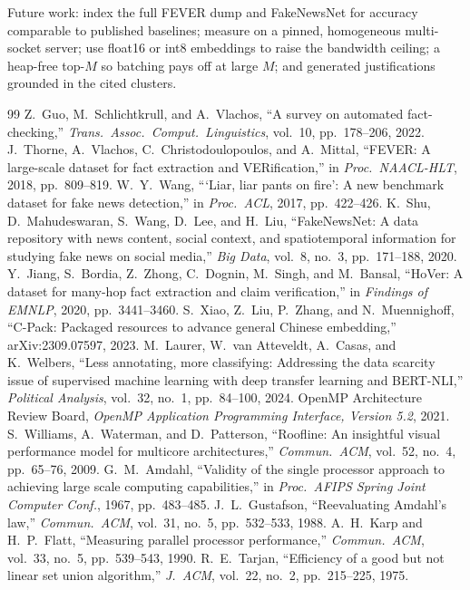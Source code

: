 \documentclass[conference,a4paper]{IEEEtran}
\begin{document}
Future work: index the full FEVER dump and FakeNewsNet for accuracy comparable to published baselines; measure on a
pinned, homogeneous multi-socket server; use float16 or int8 embeddings to raise the bandwidth ceiling; a heap-free
top-$M$ so batching pays off at large $M$; and generated justifications grounded in the cited clusters.

\begin{thebibliography}{99}
 Z.~Guo, M.~Schlichtkrull, and A.~Vlachos, ``A survey on automated fact-checking,'' \emph{Trans.\
Assoc.\ Comput.\ Linguistics}, vol.~10, pp.~178--206, 2022.
 J.~Thorne, A.~Vlachos, C.~Christodoulopoulos, and A.~Mittal, ``FEVER: A large-scale dataset for fact
extraction and VERification,'' in \emph{Proc.\ NAACL-HLT}, 2018, pp.~809--819.
\bibitem{liar} W.~Y.~Wang, ```Liar, liar pants on fire': A new benchmark dataset for fake news detection,'' in
\emph{Proc.\ ACL}, 2017, pp.~422--426.
 K.~Shu, D.~Mahudeswaran, S.~Wang, D.~Lee, and H.~Liu, ``FakeNewsNet: A data repository with news
content, social context, and spatiotemporal information for studying fake news on social media,'' \emph{Big Data},
vol.~8, no.~3, pp.~171--188, 2020.
 Y.~Jiang, S.~Bordia, Z.~Zhong, C.~Dognin, M.~Singh, and M.~Bansal, ``HoVer: A dataset for many-hop fact
extraction and claim verification,'' in \emph{Findings of EMNLP}, 2020, pp.~3441--3460.
\bibitem{bge} S.~Xiao, Z.~Liu, P.~Zhang, and N.~Muennighoff, ``C-Pack: Packaged resources to advance general Chinese
embedding,'' arXiv:2309.07597, 2023.
 M.~Laurer, W.~van Atteveldt, A.~Casas, and K.~Welbers, ``Less annotating, more classifying:
Addressing the data scarcity issue of supervised machine learning with deep transfer learning and BERT-NLI,''
\emph{Political Analysis}, vol.~32, no.~1, pp.~84--100, 2024.
 OpenMP Architecture Review Board, \emph{OpenMP Application Programming Interface, Version 5.2}, 2021.
\bibitem{roofline} S.~Williams, A.~Waterman, and D.~Patterson, ``Roofline: An insightful visual performance model for
multicore architectures,'' \emph{Commun.\ ACM}, vol.~52, no.~4, pp.~65--76, 2009.
\bibitem{amdahl} G.~M.~Amdahl, ``Validity of the single processor approach to achieving large scale computing
capabilities,'' in \emph{Proc.\ AFIPS Spring Joint Computer Conf.}, 1967, pp.~483--485.
\bibitem{gustafson} J.~L.~Gustafson, ``Reevaluating Amdahl's law,'' \emph{Commun.\ ACM}, vol.~31, no.~5, pp.~532--533,
1988.
 A.~H.~Karp and H.~P.~Flatt, ``Measuring parallel processor performance,'' \emph{Commun.\ ACM},
vol.~33, no.~5, pp.~539--543, 1990.
 R.~E.~Tarjan, ``Efficiency of a good but not linear set union algorithm,'' \emph{J.\ ACM}, vol.~22,
no.~2, pp.~215--225, 1975.
\end{thebibliography}
\end{document}
